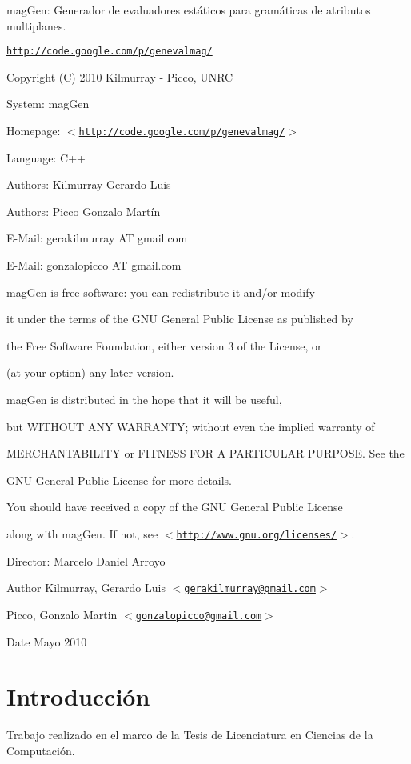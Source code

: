 magGen: Generador de evaluadores estáticos para gramáticas de atributos multiplanes.\par
 \href{http://code.google.com/p/genevalmag/}{\tt http://code.google.com/p/genevalmag/}\par
 Copyright (C) 2010 Kilmurray -\/ Picco, UNRC\par


System: magGen\par
 Homepage: $<$\href{http://code.google.com/p/genevalmag/}{\tt http://code.google.com/p/genevalmag/}$>$\par
 Language: C++\par
 \par
 Authors: Kilmurray Gerardo Luis\par
 Authors: Picco Gonzalo Martín\par
 E-\/Mail: gerakilmurray AT gmail.com\par
 E-\/Mail: gonzalopicco AT gmail.com\par
 \par
 magGen is free software: you can redistribute it and/or modify\par
 it under the terms of the GNU General Public License as published by\par
 the Free Software Foundation, either version 3 of the License, or\par
 (at your option) any later version.\par


magGen is distributed in the hope that it will be useful,\par
 but WITHOUT ANY WARRANTY; without even the implied warranty of\par
 MERCHANTABILITY or FITNESS FOR A PARTICULAR PURPOSE. See the\par
 GNU General Public License for more details.\par


You should have received a copy of the GNU General Public License\par
 along with magGen. If not, see $<$\href{http://www.gnu.org/licenses/}{\tt http://www.gnu.org/licenses/}$>$.\par


\par
Director: Marcelo Daniel Arroyo \par


\begin{DoxyAuthor}{Author}
Kilmurray, Gerardo Luis $<$\href{mailto:gerakilmurray@gmail.com}{\tt gerakilmurray@gmail.com}$>$ 

Picco, Gonzalo Martin $<$\href{mailto:gonzalopicco@gmail.com}{\tt gonzalopicco@gmail.com}$>$
\end{DoxyAuthor}
\begin{DoxyDate}{Date}
Mayo 2010
\end{DoxyDate}
\hypertarget{index_intro}{}\section{Introducción}\label{index_intro}
Trabajo realizado en el marco de la Tesis de Licenciatura en Ciencias de la Computación.

